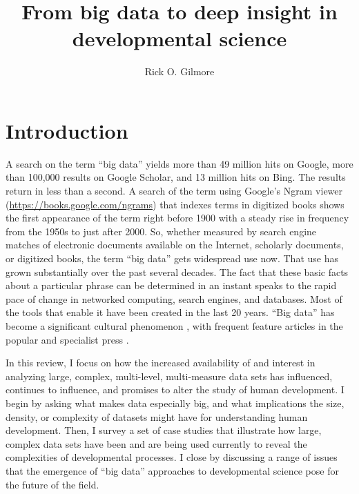 \documentclass[letterpaper,man,apacite]{apa6}
\title{From big data to deep insight in developmental science}
\author{Rick O. Gilmore}
\affiliation{{The Pennsylvania State University}, {The Databrary Project}}
\begin{document}
\maketitle

\section{Introduction}

A search on the term ``big data'' yields more than 49 million hits on Google, more than 100,000 results on Google Scholar, and 13 million hits on Bing.
The results return in less than a second.
A search of the term using Google's Ngram viewer (\url{https://books.google.com/ngrams}) that indexes terms in digitized books shows the first appearance of the term right before 1900 with a steady rise in frequency from the 1950s to just after 2000.
So, whether measured by search engine matches of electronic documents available on the Internet, scholarly documents, or digitized books, the term ``big data'' gets widespread use now.
That use has grown substantially over the past several decades.
The fact that these basic facts about a particular phrase can be determined in an instant speaks to the rapid pace of change in networked computing, search engines, and databases.
Most of the tools that enable it have been created in the last 20 years.
``Big data'' has become a significant cultural phenomenon \cite{borgman_big_2015,boyd_critical_2012}, with frequent feature articles in the popular \cite{lohr_big_2012,Marcus2013} and specialist press \cite{HBR2015,Press2013a}.

In this review, I focus on how the increased availability of and interest in analyzing large, complex, multi-level, multi-measure data sets has influenced, continues to influence, and promises to alter the study of human development.
I begin by asking what makes data especially big, and what implications the size, density, or complexity of datasets might have for understanding human development.
Then, I survey a set of case studies that illustrate how large, complex data sets have been and are being used currently to reveal the complexities of developmental processes.
I close by discussing a range of issues that the emergence of ``big data'' approaches to developmental science pose for the future of the field.
\end{document}
